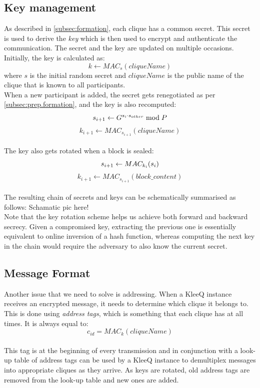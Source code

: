 \documentclass[a4paper, 12pt]{report}
\begin{document}
\subsection{Key management}
\label{subsec:prep.keyman}
As described in \cref{subsec:formation}, each clique has a common secret. This secret is used to derive the \emph{key} which is then used to encrypt and authenticate the communication. The secret and the key are updated on multiple occasions. Initially, the key is calculated as:
\begin{equation*}
    k \leftarrow MAC_{s}(cliqueName)
\end{equation*}
where $s$ is the initial random secret and $cliqueName$ is the public name of the clique that is known to all participants. \\ 

When a new participant is added, the secret gets renegotiated as per \cref{subsec:prep.formation}, and the key is also recomputed: \\
\[
    s_{i+1} \leftarrow G^{s_i \cdot s_{other}} \bmod P  \\ 
\]
\[
    k_{i+1} \leftarrow MAC_{s_{i+1}}(cliqueName)
\] \\


The key also gets rotated when a block is sealed:
\[
    s_{i+1} \leftarrow MAC_{k_i}(s_i) \\ 
\]
\[
    k_{i+1} \leftarrow MAC_{s_{i+1}}(block\_content)
\] \\

The resulting chain of secrets and keys can be schematically summarised as follows:
{ 
    {\color{red} Schamatic pic here!}
} \\ 
Note that the key rotation scheme helps us achieve both forward and backward secrecy. Given a compromised key, extracting the previous one is essentially equivalent to online inversion of a hash function, whereas computing the next key in the chain would require the adversary to also know the current secret.


\subsection{Message Format}
\label{ssec:prep.proto.msg_fmt}
Another issue that we need to solve is addressing. When a KleeQ instance receives an encrypted message, it needs to determine which clique it belongs to. This is done using \emph{address tags}, which is something that each clique has at all times. It is always equal to:
\begin{equation*}
    c_{id} = MAC_{k}(cliqueName)
\end{equation*} \\
This tag is at the beginning of every transmission and in conjunction with a look-up table of address tags can be used by a KleeQ instance to demultiplex messages into appropriate cliques as they arrive. As keys are rotated, old address tags are removed from the look-up table and new ones are added.\\
\end{document}
